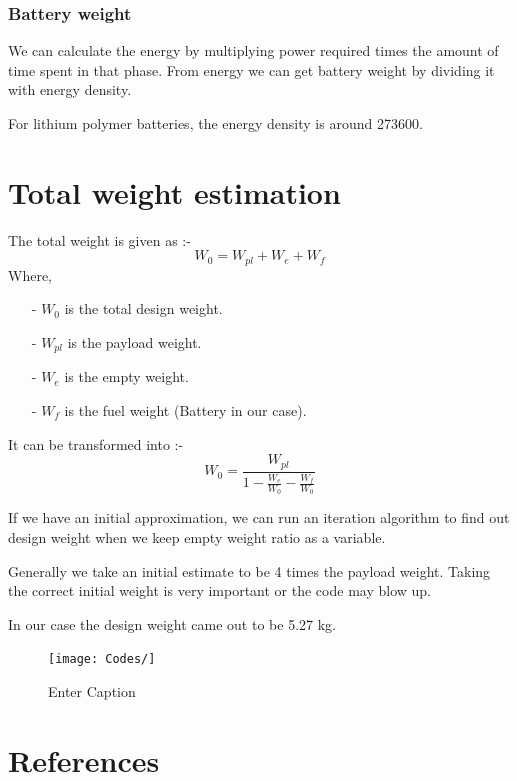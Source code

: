 \documentclass[12 pt]{article}
\begin{document}
\subsubsection{Battery weight}

We can calculate the energy by multiplying power required times the amount of time spent in that phase. From energy we can get battery weight by dividing it with energy density. 

For lithium polymer batteries, the energy density is around 273600.

\section{Total weight estimation}

The total weight is given as :- 
$$ W_0 = W_{pl} + W_{e} + W_{f} $$
Where,
\begin{itemize}
    \item[-] $W_0$ is the total design weight.
    \item [-] $W_{pl}$ is the payload weight.
    \item [-] $W_{e}$ is the empty weight.
    \item [-] $W_{f}$ is the fuel weight (Battery in our case).
\end{itemize}

It can be transformed into :- 
$$W_{0} = \frac{W_{pl}}{1 - \frac{W_{e}}{W_{0}} - \frac{W_{f}}{W_0}}$$

If we have an initial approximation, we can run an iteration algorithm to find out design weight when we keep empty weight ratio as a variable.

Generally we take an initial estimate to be 4 times the payload weight. Taking the correct initial weight is very important or the code may blow up.

In our case the design weight came out to be 5.27 kg.

\begin{figure}
    \centering
    \texttt{[image: Codes/]}
    \caption{Enter Caption}
    \label{fig:enter-label}
\end{figure}

\vfill

\newpage

\appendix

\newpage

\section{References}
\end{document}
